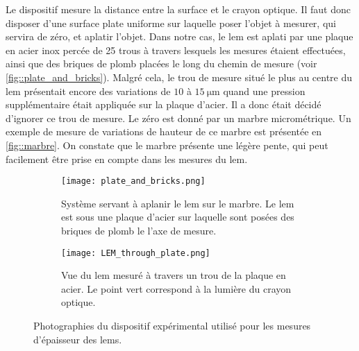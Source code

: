            Le dispositif mesure la distance entre la surface et le crayon optique. Il faut donc disposer d'une surface plate uniforme sur laquelle poser l'objet à mesurer, qui servira de zéro, et aplatir l'objet. Dans notre cas, le \gls{lem} est aplati par une plaque en acier inox percée de 25 trous à travers lesquels les mesures étaient effectuées, ainsi que des briques de plomb placées le long du chemin de mesure (voir \autoref{fig::plate_and_bricks}). Malgré cela, le trou de mesure situé le plus au centre du \gls{lem} présentait encore des variations de $10$ à $\SI{15}{\micro\meter}$ quand une pression supplémentaire était appliquée sur la plaque d'acier. Il a donc était décidé d'ignorer ce trou de mesure. Le zéro est donné  par un marbre micrométrique. Un exemple de mesure de variations de hauteur de ce marbre est présentée en \autoref{fig::marbre}. On constate que le marbre présente une légère pente, qui peut facilement être prise en compte dans les mesures du \gls{lem}.

          \begin{figure}[!htb]
            \begin{subfigure}[t]{0.5\textwidth}
              \centering
              \texttt{[image: plate\_and\_bricks.png]}
              \caption{\label{fig::plate_and_bricks}Système servant à aplanir le \gls{lem} sur le marbre. Le \gls{lem} est sous une plaque d'acier sur laquelle sont posées des briques de plomb le l'axe de mesure.}
            \end{subfigure}
            \hfill
            \begin{subfigure}[t]{0.395\textwidth}
              \centering
              \texttt{[image: LEM\_through\_plate.png]}
              \caption{\label{fig::LEM_through_plate}Vue du \gls{lem} mesuré à travers un trou de la plaque en acier. Le point vert correspond à la lumière du crayon optique.}
            \end{subfigure}
            \caption[Photographies du dispositif expérimental utilisé pour les mesures d'épaisseur des LEM]{\label{fig::dispositif_experimental}Photographies du dispositif expérimental utilisé pour les mesures d'épaisseur des \glspl{lem}.}
          \end{figure}

